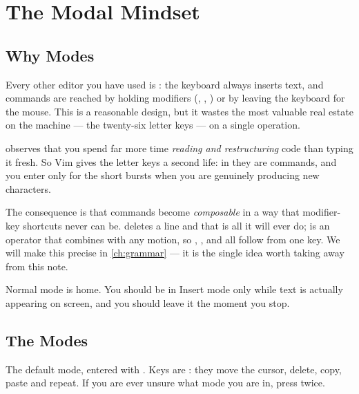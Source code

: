 \chapter{The Modal Mindset}\label{ch:modes}

\section{Why Modes}

Every other editor you have used is : the keyboard always
inserts text, and commands are reached by holding modifiers
(, , ) or by leaving the keyboard for the
mouse. This is a reasonable design, but it wastes the most valuable real estate
on the machine --- the twenty-six letter keys --- on a single operation.

\begin{intuition}
	 observes that you spend far more time \emph{reading and
		restructuring} code than typing it fresh. So Vim gives the letter keys a
	second life: in  they are commands, and you enter
	 only for the short bursts when you are genuinely producing
	new characters.
\end{intuition}

The consequence is that commands become \emph{composable} in a way that
modifier-key shortcuts never can be.  deletes a line and that is
all it will ever do;  is an operator that combines with any motion, so
 ,  \key{\$},   \key{(} and  \key{/}
    all follow from one key. We will make this
precise in \autoref{ch:grammar} --- it is the single idea worth taking away from
this note.

\begin{moral}
	Normal mode is home. You should be in Insert mode only while text is actually
	appearing on screen, and you should leave it the moment you stop.
\end{moral}

\section{The Modes}

\begin{definition}
	The default mode, entered with . Keys are : they
	move the cursor, delete, copy, paste and repeat. If you are ever unsure what
	mode you are in, press  twice.
\end{definition}

